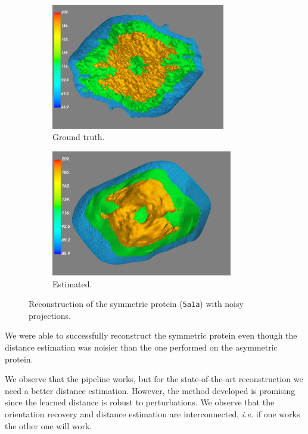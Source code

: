 \begin{figure}[ht!]
    \centering
    \begin{subfigure}[b]{0.45\textwidth}
        \includegraphics[height=5.5cm]{images/5a1a_ground_truth.png}
        \caption{Ground truth.}
    \end{subfigure}
    \hfill
    \begin{subfigure}[b]{0.5\textwidth}
    \centering
        \includegraphics[height=5.5cm]{images/5a1a_aligned.png}
        \caption{Estimated.}
    \end{subfigure}
    \caption{
        Reconstruction of the symmetric protein (\texttt{5a1a}) with noisy projections.
    }\label{fig:5a1a-reconstruction-noise0}
\end{figure}

We were able to successfully reconstruct the symmetric protein even though the distance estimation was noisier than the one performed on the asymmetric protein.

We observe that the pipeline works, but for the state-of-the-art reconstruction we need a better distance estimation.
However, the method developed is promising since the learned distance is robust to perturbations.
We observe that the orientation recovery and distance estimation are interconnected, \textit{i.e.} if one works the other one will work.

